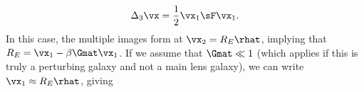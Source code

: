 \begin{equation}
\Delta_3 \vx = \frac{1}{2} \vx_1 \sF \vx_1.
\end{equation}
In this case, the multiple images form at $\vx_2 = R_E \rhat$, implying that $R_E = \vx_1 - \beta \Gmat \vx_1$. If we assume that $\Gmat \ll 1$ (which applies if this is truly a perturbing galaxy and not a main lens galaxy), we can write $\vx_1 \approx R_E \rhat$, giving